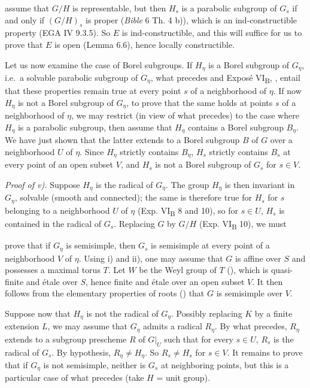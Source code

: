 assume that \(G/H\) is representable, but then \(H_{s}\) is a parabolic subgroup of \(G_{s}\) if and only if \((G/H)_{s}\) is
proper (\emph{Bible} 6 Th. 4 b)), which is an ind-constructible property (EGA IV 9.3.5). So \(E\) is ind-constructible, and
this will suffice for us to prove that \(E\) is open (Lemma 6.6), hence locally constructible.

Let us now examine the case of Borel subgroups. If \(H_{\eta}\) is a Borel subgroup of \(G_{\eta}\), i.e.~a solvable
parabolic subgroup of \(G_{\eta}\), what precedes and Exposé VI\textsubscript{B}, , entail that these properties remain true at every
point \(s\) of a neighborhood of \(\eta\). If now \(H_{\eta}\) is not a Borel subgroup of \(G_{\eta}\), to prove that the same
holds at points \(s\) of a neighborhood of \(\eta\), we may restrict (in view of what precedes) to the case where \(H_{\eta}\)
is a parabolic subgroup, then assume that \(H_{\eta}\) contains a Borel subgroup \(B_{\eta}\). We have just shown that the
latter extends to a Borel subgroup \(B\) of \(G\) over a neighborhood \(U\) of \(\eta\). Since \(H_{\eta}\) strictly contains
\(B_{\eta}\), \(H_{s}\) strictly contains \(B_{s}\) at every point of an open subset \(V\), and \(H_{s}\) is not a Borel subgroup
of \(G_{s}\) for \(s \in V\).

\emph{Proof of v).} Suppose \(H_{\eta}\) is the radical of \(G_{\eta}\). The group \(H_{\eta}\) is then invariant in \(G_{\eta}\),
solvable (smooth and connected); the same is therefore true for \(H_{s}\) for \(s\) belonging to a neighborhood \(U\) of
\(\eta\) (Exp. VI\textsubscript{B} 8 and 10), so for \(s \in U\), \(H_{s}\) is contained in the radical of \(G_{s}\). Replacing \(G\) by \(G/H\)
(Exp. VI\textsubscript{B} 10), we must

prove that if \(G_{\eta}\) is semisimple, then \(G_{s}\) is semisimple at every point of a neighborhood \(V\) of \(\eta\). Using
i) and ii), one may assume that \(G\) is affine over \(S\) and possesses a maximal torus \(T\). Let \(W\) be the Weyl group of
\(T\) (), which is quasi-finite and étale over \(S\), hence finite and étale over an open subset \(V\). It then
follows from the elementary properties of roots () that \(G\) is semisimple over \(V\).

Suppose now that \(H_{\eta}\) is not the radical of \(G_{\eta}\). Possibly replacing \(K\) by a finite extension \(L\), we may
assume that \(G_{\eta}\) admits a radical \(R_{\eta}\). By what precedes, \(R_{\eta}\) extends to a subgroup prescheme \(R\) of
\(G|_{U}\) such that for every \(s \in U\), \(R_{s}\) is the radical of \(G_{s}\). By hypothesis, \(R_{\eta} \neq H_{\eta}\). So
\(R_{s} \neq H_{s}\) for \(s \in V\). It remains to prove that if \(G_{\eta}\) is not semisimple, neither is \(G_{s}\) at
neighboring points, but this is a particular case of what precedes (take \(H\) = unit group).

